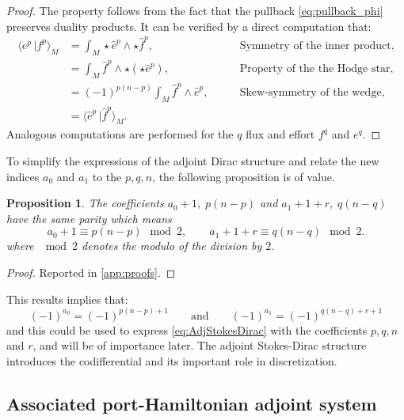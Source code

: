 \documentclass{elsarticle}
\newtheorem{proposition}{Proposition}
\newcommand*{\dual}[1]{\ensuremath{\widehat{#1}}}
\newcommand{\dualpr}[3][]{\ensuremath{\langle #2 \, \vert #3 \rangle_{#1}}}
\begin{document}
\begin{proof}
    The property follows from the fact that the pullback \eqref{eq:pullback_phi} preserves duality products. It can be  verified by a direct computation that:
    \begin{equation}
    \begin{aligned}
    \dualpr[M]{e^p}{f^p} &= \int_M \star \dual{e}^p \wedge \star \dual{f}^p, \qquad &\text{Symmetry of the inner product}, \\
    &= \int_M \dual{f}^p \wedge \star (\star \dual{e}^p), \qquad &\text{Property of the the Hodge star}, \\
    &= (-1)^{p(n-p)} \int_M \dual{f}^p \wedge  \dual{e}^p, \qquad &\text{Skew-symmetry of the wedge},  \\
    &= \dualpr[M]{\dual{e}^p}{\dual{f}^p}.
    \end{aligned} 
\end{equation}
Analogous computations are performed for the $q$ flux and effort $f^q$ and $e^q$.
\end{proof}
To simplify the expressions of the adjoint Dirac structure and relate the new indices $a_0$ and $a_1$ to the $p,q,n$, the following proposition is of value.
\begin{proposition}\label{pr:parity_a0_a1}
The coefficients $a_0 + 1, \;p(n-p)$ and $a_1 + 1 +r, \; q(n-q)$ have the same parity which means
\begin{equation}
    a_0 + 1 \equiv p(n-p) \mod{2}, \qquad a_1 + 1 + r \equiv q(n-q) \mod{2}.
\end{equation}
where $\mod{2}$ denotes the modulo of the division by $2$.
\end{proposition}
\begin{proof}
Reported in \ref{app:proofs}.
\end{proof}
\noindent This results implies that:
\[
(-1)^{a_0}=(-1)^{p(n-p)+1}
\qquad \text{and}
\qquad
(-1)^{a_1}=(-1)^{q(n-q)+r+1}
\]
and this could be used to express \eqref{eq:AdjStokesDirac} with the coefficients $p,q,n$ and $r$, and will be of importance later. The adjoint Stokes-Dirac structure introduces the codifferential and its important role in discretization. 

\subsection{Associated port-Hamiltonian adjoint system}
\end{document}
